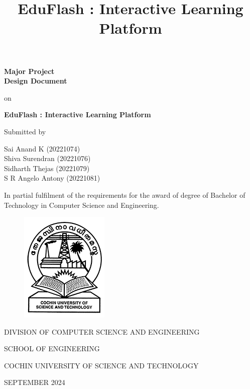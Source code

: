 \documentclass{report}
\renewcommand{\maketitle}{
\pagenumbering{gobble}
\begin{center}
\huge
\textbf{Major Project} \\[1em]
\huge
\textbf{Design Document} \\[2em] %



\vspace{1em}

on

\vspace{1em}


\vspace{1em}
\LARGE
\textbf{EduFlash : Interactive Learning Platform}




\hspace{1em}

Submitted by\\
\vspace{1em}

\Large
Sai Anand K (20221074)\\
Shiva Surendran (20221076)\\
Sidharth Thejas (20221079)\\
S R Angelo Antony (20221081)\\
\end{center}
}
\begin{document}
\begin{center}
\title{EduFlash : Interactive Learning Platform}
\vspace*{\fill}

\maketitle

\begin{center}
\large
In partial fulfilment of the requirements for the award of degree of Bachelor of Technology in Computer Science and Engineering.

\begin{figure}[hbtp]
\centering
\includegraphics[scale=0.6]{cusatlogo.png}
\end{figure}  

\LARGE
DIVISION OF COMPUTER SCIENCE AND ENGINEERING

SCHOOL OF ENGINEERING

COCHIN UNIVERSITY OF SCIENCE AND TECHNOLOGY

\hspace{1em}

\large
SEPTEMBER 2024
\end{center}
\end{center}
\vspace*{\fill}

\newpage
{}
\vspace*{\fill}
\end{document}
